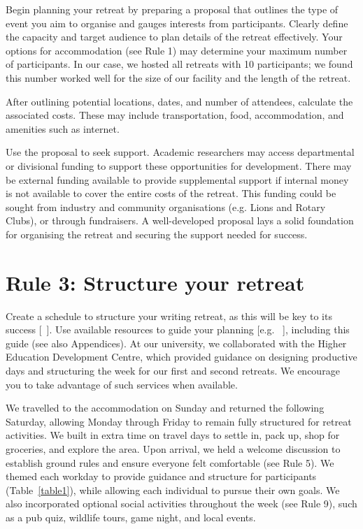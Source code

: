 \documentclass[10pt,letterpaper]{article}
\begin{document}
Begin planning your retreat by preparing a proposal that outlines the type of event you aim to organise and gauges interests from participants. Clearly define the capacity and target audience to plan details of the retreat effectively. Your options for accommodation (see Rule 1) may determine your maximum number of participants. In our case, we hosted all retreats with 10 participants; we found this number worked well for the size of our facility and the length of the retreat.

After outlining potential locations, dates, and number of attendees, calculate the associated costs. These may include transportation, food, accommodation, and amenities such as internet.

Use the proposal to seek support. Academic researchers may access departmental or divisional funding to support these opportunities for development. There may be external funding available to provide supplemental support if internal money is not available to cover the entire costs of the retreat. This funding could be sought from industry and community organisations (e.g. Lions and Rotary Clubs), or through fundraisers. A well-developed proposal lays a solid foundation for organising the retreat and securing the support needed for success.

\section*{Rule 3: Structure your retreat}

Create a schedule to structure your writing retreat, as this will be key to its success [~\cite{murray2009, tremblay2021}]. Use available resources to guide your planning [e.g. ~\cite{tremblay2021}], including this guide (see also Appendices). At our university, we collaborated with the Higher Education Development Centre, which provided guidance on designing productive days and structuring the week for our first and second retreats. We encourage you to take advantage of such services when available.

We travelled to the accommodation on Sunday and returned the following Saturday, allowing Monday through Friday to remain fully structured for retreat activities. We built in extra time on travel days to settle in, pack up, shop for groceries, and explore the area. Upon arrival, we held a welcome discussion to establish ground rules and ensure everyone felt comfortable (see Rule 5). We themed each workday to provide guidance and structure for participants (Table~\ref{table1}), while allowing each individual to pursue their own goals. We also incorporated optional social activities throughout the week (see Rule 9), such as a pub quiz, wildlife tours, game night, and local events.
\end{document}
